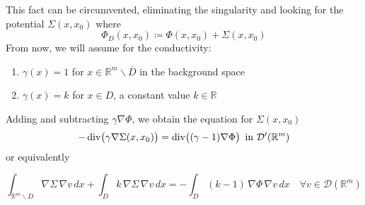 \documentclass[10pt, a4paper, twoside, openright]{book}
\theoremstyle{definition}
\theoremstyle{plain}
\theoremstyle{plain}
\theoremstyle{plain}
\theoremstyle{plain}
\theoremstyle{plain}
\theoremstyle{plain}
\theoremstyle{plain}
\theoremstyle{plain}
\DeclareMathOperator{\divergence}{div}
\begin{document}
This fact can be circumvented, eliminating the singularity and looking for the potential $\Sigma(x,x_0)$ where
\begin{equation}
 \Phi_D(x,x_0)\coloneqq \Phi(x,x_0) + \Sigma(x,x_0)
\end{equation}
From now, we will assume for the conductivity:
\begin{enumerate}
 \item $\gamma(x) = 1$ for $x\in\mathbb{R}^m\backslash\overline{D}$ in the background space
 \item $\gamma(x) = k$ for $x\in D$, a constant value $k\in \mathbb{R}$
\end{enumerate}
Adding and subtracting $\gamma\nabla \Phi$, we obtain the equation for $\Sigma(x,x_0)$
\begin{equation}
 -\divergence\bigl(\gamma\nabla \Sigma(x,x_0)\bigr)=\divergence\bigl((\gamma - 1)\nabla\Phi\bigr)\,\textup{ in }\mathcal{D}'(\mathbb{R}^m)
\end{equation}
or equivalently
\begin{center}
\colorbox{light-gray}{\color{black}\parbox{\textwidth}{
\begin{equation}
 \int_{\mathbb{R}^m \backslash D}\nabla \Sigma\,\nabla v\, dx + \int_{D} k \, \nabla \Sigma\,\nabla v \, dx = - \int_D(k-1)\,\nabla \Phi\,\nabla v \,dx\quad\forall v \in \mathcal{D}(\mathbb{R}^m)
 \label{eq:variational-F}
\end{equation}
}}
\end{center}
\end{document}
